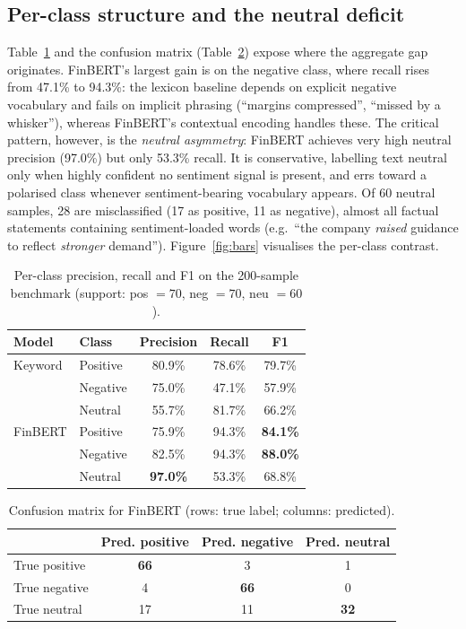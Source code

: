 \documentclass[12pt,a4paper]{article}
\begin{document}
\subsection{Per-class structure and the neutral deficit}
Table~\ref{tab:perclass} and the confusion matrix (Table~\ref{tab:cm}) expose where
the aggregate gap originates. FinBERT's largest gain is on the negative class, where
recall rises from 47.1\% to 94.3\%: the lexicon baseline depends on explicit negative
vocabulary and fails on implicit phrasing (``margins compressed'', ``missed by a
whisker''), whereas FinBERT's contextual encoding handles these. The critical
pattern, however, is the \emph{neutral asymmetry}: FinBERT achieves very high neutral
precision (97.0\%) but only 53.3\% recall. It is conservative, labelling text
neutral only when highly confident no sentiment signal is present, and errs toward a
polarised class whenever sentiment-bearing vocabulary appears. Of 60 neutral samples,
28 are misclassified (17 as positive, 11 as negative), almost all factual statements
containing sentiment-loaded words (e.g.\ ``the company \emph{raised} guidance to
reflect \emph{stronger} demand''). Figure~\ref{fig:bars} visualises the per-class
contrast.

\begin{table}[ht]
\centering
\caption{Per-class precision, recall and F1 on the 200-sample benchmark (support:
pos $=70$, neg $=70$, neu $=60$).}
\label{tab:perclass}
\begin{tabular}{llccc}
\toprule
\textbf{Model} & \textbf{Class} & \textbf{Precision} & \textbf{Recall} & \textbf{F1} \\
\midrule
Keyword & Positive & 80.9\% & 78.6\% & 79.7\% \\
        & Negative & 75.0\% & 47.1\% & 57.9\% \\
        & Neutral  & 55.7\% & 81.7\% & 66.2\% \\
\midrule
FinBERT & Positive & 75.9\% & 94.3\% & \textbf{84.1\%} \\
        & Negative & 82.5\% & 94.3\% & \textbf{88.0\%} \\
        & Neutral  & \textbf{97.0\%} & 53.3\% & 68.8\% \\
\bottomrule
\end{tabular}
\end{table}

\begin{table}[ht]
\centering
\caption{Confusion matrix for FinBERT (rows: true label; columns: predicted).}
\label{tab:cm}
\begin{tabular}{lccc}
\toprule
 & \textbf{Pred. positive} & \textbf{Pred. negative} & \textbf{Pred. neutral} \\
\midrule
True positive & \textbf{66} & 3 & 1 \\
True negative & 4 & \textbf{66} & 0 \\
True neutral  & 17 & 11 & \textbf{32} \\
\bottomrule
\end{tabular}
\end{table}
\end{document}
